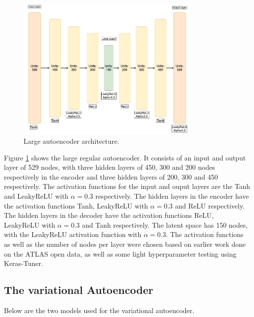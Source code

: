 \begin{figure}[H]
    \centering
    \includegraphics[width=0.8\textwidth]{Figures/nnarchitect/ae_big.jpeg}
    \caption[AE | Large network architecture]{Large autoencoder architecture.}
    \label{fig:ae_big}
\end{figure}

Figure \ref{fig:ae_big} shows the large regular autoencoder. It consists of an input and output layer of 529 nodes, with three 
hidden layers of 450, 300 and 200 nodes respectively in the encoder and three hidden layers of 200, 300 and 450 respectively. 
The activation functions for the input and ouput layers are the Tanh and LeakyReLU with $\alpha=0.3$ respectively. The hidden 
layers in the encoder have the activation functions Tanh, LeakyReLU with $\alpha=0.3$ and ReLU respectively. The hidden layers
in the decoder have the activation functions ReLU, LeakyReLU with $\alpha=0.3$ and Tanh respectively. The latent space has 150 nodes,
with the LeakyReLU activation function with $\alpha=0.3$. The activation functions as well as the number of nodes per layer were chosen based on earlier work done 
on the ATLAS open data\cite{fys5555}, as well as some light hyperparameter testing using Keras-Tuner\cite{omalley2019kerastuner}.
\subsection*{The variational Autoencoder}
Below are the two models used for the variational autoencoder. 


